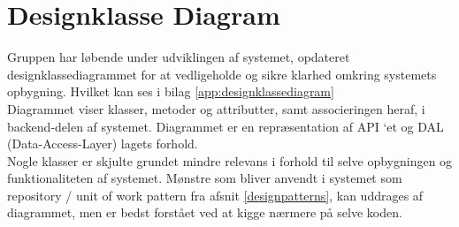 \section{Designklasse Diagram}\label{Designklassediagram}
Gruppen har løbende under udviklingen af systemet, opdateret designklassediagrammet for at vedligeholde 
og sikre klarhed omkring systemets opbygning. Hvilket kan ses i bilag \ref{app:designklassediagram}\\

Diagrammet viser klasser, metoder og attributter, samt associeringen heraf, i backend-delen af systemet. 
Diagrammet er en repræsentation af API ‘et og DAL (Data-Access-Layer) lagets forhold.\\

Nogle klasser er skjulte grundet mindre relevans i forhold til selve opbygningen og funktionaliteten af systemet. 
Mønstre som bliver anvendt i systemet som repository / unit of work pattern fra afsnit \ref{designpatterns}, 
kan uddrages af diagrammet, men er bedst forstået ved at kigge nærmere på selve koden.
